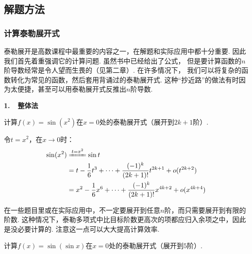 \subsection{解题方法}\par
\subsubsection{计算泰勒展开式}\par
泰勒展开是高数课程中最重要的内容之一，在解题和实际应用中都十分重要.
因此我们首先着重强调它的计算问题.
虽然书中已经给出了公式，
但是要计算函数的$n$阶导数经常是令人望而生畏的（见第二章）.
在许多情况下，
我们可以将复杂的函数转化为常见的函数，然后套用背诵过的泰勒展开式.
这种“抄近路”的做法有时因为太便捷，甚至可以用泰勒展开式反推出$n$阶导数. \par \vspace{1em}

\textbf{1.~~整体法}

\begin{example}
\label{ex:ch04-01}
计算$f(x)=\sin(x^2)$在$x=0$处的泰勒展开式（展开到$2k+1$阶）.
\end{example}

\begin{solution}
令$t=x^2$，在$x \to 0$时：
\begin{equation}
    \begin{aligned}
        \sin (x^2) &\xlongequal{t = x^2} \sin t \\
        &= t - \frac{1}{6} t^3 + \cdots + \frac{(-1)^{k}}{(2k+1)!} t^{2k+1} + o(t^{2k+2}) \\
        &= x^2 -\frac{1}{6} x^6 +\cdots + \frac{(-1)^{k}}{(2k+1)!} x^{4k+2} + o(x^{4k+4})         \nonumber
    \end{aligned}
\end{equation}
\end{solution}

在一些题目里或在实际应用中，不一定要展开到任意$n$阶，而只需要展开到有限的阶数.
这种情况下，泰勒多项式中比目标阶数更高次的项都应归入余项之中，因此是没必要计算的.
注意这一点可以大大提高计算效率.

\begin{example}
\label{ex:ch04-02}
计算$f(x)=\sin(\sin x)$在$x=0$处的泰勒展开式（展开到$5$阶）.
\end{example}

